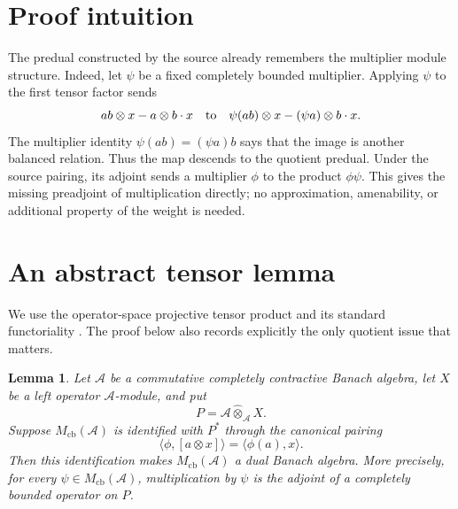\documentclass[11pt]{article}
\newtheorem{lemma}[theorem]{Lemma}
\newcommand{\A}{\mathcal A}
\newcommand{\Mcb}{M_{\mathrm{cb}}}
\begin{document}
\section{Proof intuition}

The predual constructed by the source already remembers the multiplier
module structure.  Indeed, let $\psi$ be a fixed completely bounded
multiplier.  Applying $\psi$ to the first tensor factor sends
\[
 ab\otimes x-a\otimes b\cdot x
 \quad\hbox{to}\quad
 \psi(ab)\otimes x-(\psi a)\otimes b\cdot x.
\]
The multiplier identity $\psi(ab)=(\psi a)b$ says that the image is another
balanced relation.  Thus the map descends to the quotient predual.  Under the
source pairing, its adjoint sends a multiplier $\phi$ to the product
$\phi\psi$.  This gives the missing preadjoint of multiplication directly;
no approximation, amenability, or additional property of the weight is
needed.

\section{An abstract tensor lemma}

We use the operator-space projective tensor product and its standard
functoriality \cite{BLM}.  The proof below also records explicitly the only
quotient issue that matters.

\begin{lemma}\label{lem:abstract}
Let $\A$ be a commutative completely contractive Banach algebra, let $X$ be a
left operator $\A$-module, and put
\[
 P=\A\widehat\otimes_{\A}X.
\]
Suppose $\Mcb(\A)$ is identified with $P^*$ through the canonical pairing
\[
 \langle\phi,[a\otimes x]\rangle=\langle\phi(a),x\rangle.
\]
Then this identification makes $\Mcb(\A)$ a dual Banach algebra.  More
precisely, for every $\psi\in\Mcb(\A)$, multiplication by $\psi$ is the
adjoint of a completely bounded operator on $P$.
\end{lemma}
\end{document}
